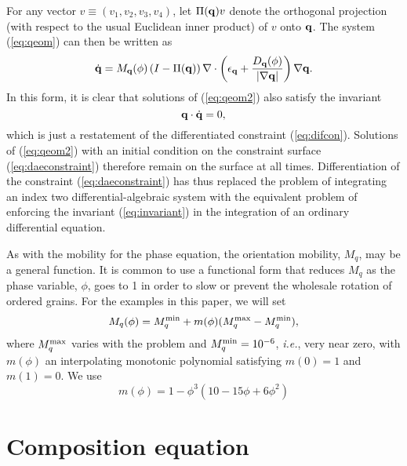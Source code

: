 For any vector $v \equiv (v_1,v_2,v_3,v_4)$, let $\Pi({\bf q})v$
denote the orthogonal projection (with respect to the usual Euclidean
inner product) of $v$ onto ${\bf q}$.  The system (\ref{eq:qeom}) can
then be written as
%
\begin{equation}
  \dot{\bf q} =
    M_{\bf q}(\phi) \left (I - \Pi({\bf q}) \right )
    \nabla \cdot \left ( \epsilon_{\bf q} + 
    \frac{D_{\bf q}(\phi)}{ |\nabla
    {\bf q}|} \right ) \nabla {\bf q}.
\label{eq:qeom2}
\end{equation}
%
In this form, it is clear that solutions of (\ref{eq:qeom2}) also satisfy
the invariant
%
\begin{equation}
  {\bf q} \cdot \dot{\bf q} = 0,
\label{eq:invariant}
\end{equation}
%
which is just a restatement of the differentiated constraint
(\ref{eq:difcon}).  Solutions of (\ref{eq:qeom2}) with an initial
condition on the constraint surface (\ref{eq:daeconstraint}) therefore
remain on the surface at all times.  Differentiation of the constraint
(\ref{eq:daeconstraint}) has thus replaced the problem of integrating
an index two differential-algebraic system with the equivalent problem
of enforcing the invariant (\ref{eq:invariant}) in the integration of
an ordinary differential equation.

As with the mobility for the phase equation, the orientation mobility,
$M_q$, may be a general function.  It is common to use a functional
form that reduces $M_q$ as the phase variable, $\phi$, goes to 1 in
order to slow or prevent the wholesale rotation of ordered grains.
For the examples in this paper, we will set
%
\begin{equation}
  M_q(\phi) = M_q^{\rm min} + m(\phi) ( M_q^{\rm max} - M_q^{\rm min} ),
\label{eq:qmobility}
\end{equation}
%
where $M_q^{\rm max}$ varies with the problem and $M_q^{\rm min} =
10^{-6}$, {\em i.e.},
very near zero, with $m(\phi)$ an interpolating monotonic polynomial
satisfying $m(0) = 1$ and $m(1) = 0$.  We use
%
\begin{equation}
  m(\phi) = 1 - \phi^3 \left( 10 - 15 \phi + 6 \phi^2 \right)
\end{equation}

%
\section{Composition equation}

